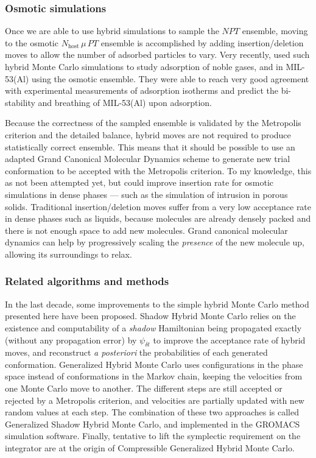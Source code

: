 \documentclass[thesis]{subfiles}
\begin{document}
\subsubsection{Osmotic simulations}

Once we are able to use hybrid simulations to sample the $NPT$ ensemble, moving
to the osmotic $N_\text{host}\,\mu\,PT$ ensemble is accomplished by adding
insertion/deletion moves to allow the number of adsorbed particles to vary. Very
recently, \citeauthor{Rogge2019}\cite{Rogge2019} used such hybrid Monte Carlo
simulations to study adsorption of noble gases,  and  in
MIL-53(Al) using the osmotic ensemble. They were able to reach very good
agreement with experimental measurements of adsorption isotherms and predict the
bi-stability and breathing of MIL-53(Al) upon adsorption.

Because the correctness of the sampled ensemble is validated by the Metropolis
criterion and the detailed balance, hybrid moves are not required to produce
statistically correct ensemble. This means that it should be possible to use an
adapted Grand Canonical Molecular Dynamics scheme to generate new trial
conformation to be accepted with the Metropolis criterion. To my knowledge, this
as not been attempted yet, but could improve insertion rate for osmotic
simulations in dense phases --- such as the simulation of intrusion in porous
solids. Traditional insertion/deletion moves suffer from a very low acceptance
rate in dense phases such as liquids, because molecules are already densely
packed and there is not enough space to add new molecules. Grand canonical
molecular dynamics can help by progressively scaling the \emph{presence} of the
new molecule up, allowing its surroundings to relax.

\subsubsection{Related algorithms and methods}

In the last decade, some improvements to the simple hybrid Monte Carlo method
presented here have been proposed. Shadow Hybrid Monte Carlo\cite{Izaguirre2004}
relies on the existence and computability of a \emph{shadow} Hamiltonian being
propagated exactly (without any propagation error) by $\psi_{\delta t}$ to
improve the acceptance rate of hybrid moves, and reconstruct \emph{a posteriori}
the probabilities of each generated conformation. Generalized Hybrid Monte
Carlo\cite{Akhmatskaya2009, Akhmatskaya2011} uses configurations in the phase
space instead of conformations in the Markov chain, keeping the velocities from
one Monte Carlo move to another. The different steps are still accepted or
rejected by a Metropolis criterion, and velocities are partially updated with
new random values at each step. The combination of these two approaches is
called Generalized Shadow Hybrid Monte Carlo, and implemented in the GROMACS
simulation software\cite{FernandezPendas2014}. Finally, tentative to lift
the symplectic requirement on the integrator are at the origin of Compressible
Generalized Hybrid Monte Carlo\cite{Fang2014}.
\end{document}
